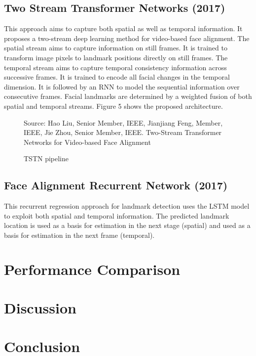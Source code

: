 \documentclass{llncs}
\begin{document}
\subsection{Two Stream Transformer Networks (2017)}

This approach aims to capture both spatial as well as temporal information. It proposes a two-stream deep learning method for video-based face alignment. The spatial stream aims to capture information on still frames. It is trained to transform image pixels to landmark positions directly on still frames. The temporal stream aims to capture temporal consistency information across successive frames. It is trained to encode all facial changes in the temporal dimension. It is followed by an RNN to model the sequential information over consecutive frames. Facial landmarks are determined by a weighted fusion of both spatial and temporal streams. Figure 5 shows the proposed architecture.

\begin{figure}
%
{Source: Hao Liu, Senior Member, IEEE, Jianjiang Feng, Member, IEEE, Jie Zhou, Senior Member, IEEE. Two-Stream Transformer Networks for Video-based Face Alignment}
\caption{TSTN pipeline}
\end{figure}

\subsection{Face Alignment Recurrent Network (2017)}

This recurrent regression approach for landmark detection uses the LSTM model to exploit both spatial and temporal information. The predicted landmark location is used as a basis for estimation in the next stage (spatial) and used as a basis for estimation in the next frame (temporal).





\section{Performance Comparison}


\section{Discussion}


\section{Conclusion}


%

%
%


%
\end{document}
